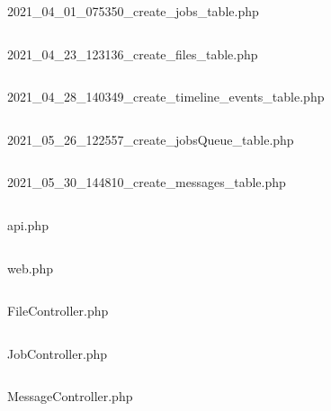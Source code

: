 \documentclass[
    iai, %
    eai, %
]{heig-tb}
\begin{document}
\begin{figure}[h]
  \inputminted[breaklines]{javascript}{assets/code/2021_04_01_075350_create_jobs_table.php}
  \caption{2021\_04\_01\_075350\_create\_jobs\_table.php}
\end{figure}

\begin{figure}[h]
  \inputminted[breaklines]{javascript}{assets/code/2021_04_23_123136_create_files_table.php}
  \caption{2021\_04\_23\_123136\_create\_files\_table.php}
\end{figure}

\begin{figure}[h]
  \inputminted[breaklines]{javascript}{assets/code/2021_04_28_140349_create_timeline_events_table.php}
  \caption{2021\_04\_28\_140349\_create\_timeline\_events\_table.php}
\end{figure}

\begin{figure}[h]
  \inputminted[breaklines]{javascript}{assets/code/2021_05_26_122557_create_jobsQueue_table.php}
  \caption{2021\_05\_26\_122557\_create\_jobsQueue_table.php}
\end{figure}

\begin{figure}[h]
  \inputminted[breaklines]{javascript}{assets/code/2021_05_30_144810_create_messages_table.php}
  \caption{2021\_05\_30\_144810\_create\_messages\_table.php}
\end{figure}

\begin{figure}[h]
  \inputminted[breaklines]{javascript}{assets/code/api.php}
  \caption{api.php}
\end{figure}

\begin{figure}[h]
  \inputminted[breaklines]{javascript}{assets/code/web.php}
  \caption{web.php}
\end{figure}

\begin{figure}[h]
  \inputminted[breaklines]{javascript}{assets/code/FileController.php}
  \caption{FileController.php}
\end{figure}

\begin{figure}[h]
  \inputminted[breaklines]{javascript}{assets/code/JobController.php}
  \caption{JobController.php}
\end{figure}

\begin{figure}[h]
  \inputminted[breaklines]{javascript}{assets/code/MessageController.php}
  \caption{MessageController.php}
\end{figure}
\end{document}
